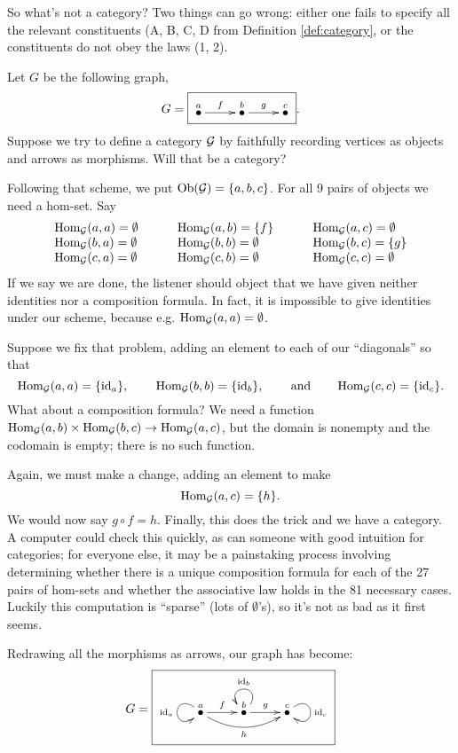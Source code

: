 \begin{example}

So what's not a category? Two things can go wrong: either one fails to specify all the relevant constituents (A, B, C, D from Definition \ref{def:category}, or the constituents do not obey the laws (1, 2).

Let $G$ be the following graph,
$$G=\fbox{\xymatrix{\LMO{a}\ar[r]^f&\LMO{b}\ar[r]^g&\LMO{c}}}.$$
Suppose we try to define a category $\mathcal{G}$ by faithfully recording vertices as objects and arrows as morphisms. Will that be a category?

Following that scheme, we put $\textnormal{Ob}(\mathcal{G})=\{a,b,c\}$. For all 9 pairs of objects we need a hom-set.
Say 
\begin{align*}
\begin{array}{lll}
\textnormal{Hom}_\mathcal{G}(a,a)=\emptyset&\hspace{.3in}\textnormal{Hom}_\mathcal{G}(a,b)=\{f\}&\hspace{.3in}\textnormal{Hom}_\mathcal{G}(a,c)=\emptyset\\
\textnormal{Hom}_\mathcal{G}(b,a)=\emptyset&\hspace{.3in}\textnormal{Hom}_\mathcal{G}(b,b)=\emptyset&\hspace{.3in}\textnormal{Hom}_\mathcal{G}(b,c)=\{g\}\\
\textnormal{Hom}_\mathcal{G}(c,a)=\emptyset&\hspace{.3in}\textnormal{Hom}_\mathcal{G}(c,b)=\emptyset&\hspace{.3in}\textnormal{Hom}_\mathcal{G}(c,c)=\emptyset
\end{array}
\end{align*}
If we say we are done, the listener should object that we have given neither identities nor a composition formula. In fact, it is impossible to give identities under our scheme, because e.g. $\textnormal{Hom}_\mathcal{G}(a,a)=\emptyset$.

Suppose we fix that problem, adding an element to each of our “diagonals” so that 
$$\textnormal{Hom}_\mathcal{G}(a,a)=\{\textnormal{id}_a\},\hspace{.3in}\textnormal{Hom}_\mathcal{G}(b,b)=\{\textnormal{id}_b\},\hspace{.3in}\textnormal{and}\hspace{.3in}\textnormal{Hom}_\mathcal{G}(c,c)=\{\textnormal{id}_c\}.$$ What about a composition formula? We need a function $\textnormal{Hom}_\mathcal{G}(a,b)\times\textnormal{Hom}_\mathcal{G}(b,c)\rightarrow\textnormal{Hom}_\mathcal{G}(a,c)$, but the domain is nonempty and the codomain is empty; there is no such function. 

Again, we must make a change, adding an element to make $$\textnormal{Hom}_\mathcal{G}(a,c)=\{h\}.$$ We would now say $g\circ f=h$. Finally, this does the trick and we have a category. A computer could check this quickly, as can someone with good intuition for categories; for everyone else, it may be a painstaking process involving determining whether there is a unique composition formula for each of the 27 pairs of hom-sets and whether the associative law holds in the 81 necessary cases. Luckily this computation is “sparse” (lots of $\emptyset$'s), so it's not as bad as it first seems.

Redrawing all the morphisms as arrows, our graph has become:
$$G=\fbox{\xymatrix{\LMO{a}\ar@(ul,dl)[]_{\id_a}\ar[r]^f\ar@/_1pc/[rr]_h&\LMO{b}\ar@(ur,ul)[]_{\id_b}\ar[r]^g&\LMO{c}\ar@(ur,dr)[]^{\id_c}}}$$

\end{example}

